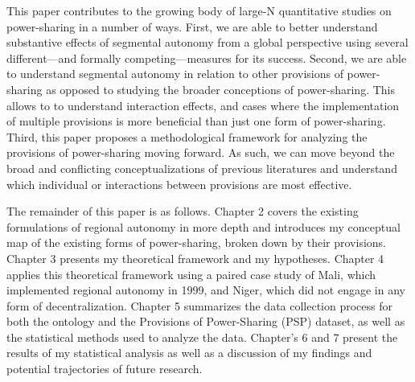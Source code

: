 \documentclass[12pt]{article}
\begin{document}
This paper contributes to the growing body of large-N quantitative studies on power-sharing in a number of ways. First, we are able to better understand substantive effects of segmental autonomy from a global perspective using several different---and formally competing---measures for its success. Second, we are able to understand segmental autonomy in relation to other provisions of power-sharing as opposed to studying the broader conceptions of power-sharing. This allows to to understand interaction effects, and cases where the implementation of multiple provisions is more beneficial than just one form of power-sharing. Third, this paper proposes a methodological framework for analyzing the provisions of power-sharing moving forward. As such, we can move beyond the broad and conflicting conceptualizations of previous literatures and understand which individual or interactions between provisions are most effective. 

The remainder of this paper is as follows. Chapter 2 covers the existing formulations of regional autonomy in more depth and introduces my conceptual map of the existing forms of power-sharing, broken down by their provisions. Chapter 3 presents my theoretical framework and my hypotheses. Chapter 4 applies this theoretical framework using a paired case study of Mali, which implemented regional autonomy in 1999, and Niger, which did not engage in any form of decentralization. Chapter 5 summarizes the data collection process for both the ontology and the Provisions of Power-Sharing (PSP) dataset, as well as the statistical methods used to analyze the data. Chapter's 6 and 7 present the results of my statistical analysis as well as a discussion of my findings and potential trajectories of future research. 
\end{document}
